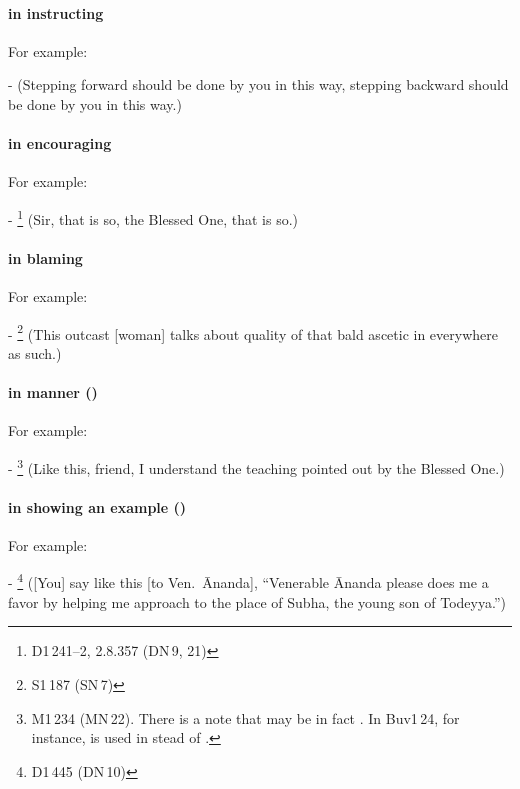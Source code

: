 \paragraph*{ in instructing} For example:\par
-  (Stepping forward should be done by you in this way, stepping backward should be done by you in this way.) \par
\paragraph*{ in encouraging} For example:\par
- \footnote{D1\,241--2, 2.8.357 (DN\,9, 21)} (Sir, that is so, the Blessed One, that is so.) \par
\paragraph*{ in blaming} For example:\par
- \footnote{S1\,187 (SN\,7)} (This outcast [woman] talks about quality of that bald ascetic in everywhere as such.) \par
\paragraph*{ in manner ()} For example:\par
- \footnote{M1\,234 (MN\,22). There is a note that  may be in fact . In Buv1\,24, for instance,  is used in stead of .} (Like this, friend, I understand the teaching pointed out by the Blessed One.) \par
\paragraph*{ in showing an example ()} For example:\par
- \footnote{D1\,445 (DN\,10)} ([You] say like this [to Ven.\ \=Ananda], ``Venerable \=Ananda please does me a favor by helping me approach to the place of Subha, the young son of Todeyya.'') \par
